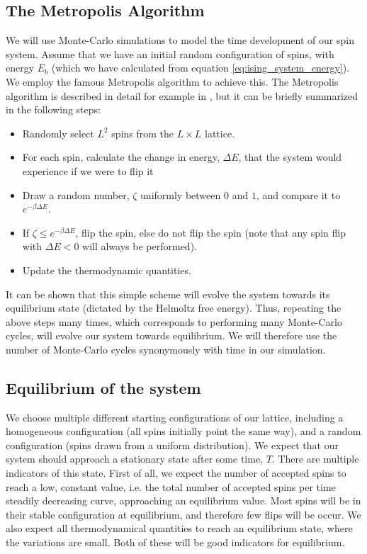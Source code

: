 \documentclass[a4paper, 10pt]{article}
\begin{document}
\subsection{The Metropolis Algorithm}\label{Monte-Carlo_algo}
We will use Monte-Carlo simulations to model the time development of our spin system. Assume that we have an initial random configuration of spins, with energy $E_b$ (which we have calculated from equation \ref{eq:ising_system_energy}). We employ the famous Metropolis algorithm to achieve this. The Metropolis algorithm is described in detail for example in \cite{Metropolis}, but it can be briefly summarized in the following steps:
\begin{itemize}
\item Randomly select $L^2$ spins from the $L\times L$ lattice.
\item For each spin, calculate the change in energy, $\Delta E$, that the system would experience if we were to flip it
\item Draw a random number, $\zeta$ uniformly between $0$ and $1$, and compare it to $e^{-\beta \Delta E}$. \item If $\zeta \leq e^{-\beta \Delta E}$, flip the spin, else do not flip the spin (note that any spin flip with $\Delta E < 0$ will always be performed).
\item Update the thermodynamic quantities.
\end{itemize}
It can be shown that this simple scheme will evolve the system towards its equilibrium state (dictated by the Helmoltz free energy). Thus, repeating the above steps many times, which corresponds to performing many Monte-Carlo cycles, will evolve our system towards equilibrium. We will therefore use the number of Monte-Carlo cycles synonymously with time in our simulation.
\subsection{Equilibrium of the system}\label{equilibrium_system}
We choose multiple different starting configurations of our lattice, including a homogeneous configuration (all spins initially point the same way), and a random configuration (spins drawn from a uniform distribution). We expect that our system should approach a stationary state after some time, $T$. There are multiple indicators of this state. First of all, we expect the number of accepted spins to reach a low, constant value, i.e. the total number of accepted spins  per time steadily decreasing curve, approaching an equilibrium value. Most spins will be in their stable configuration at equilibrium, and therefore few flips will be occur. We also expect all thermodynamical quantities to reach an equilibrium state, where the variations are small. Both of these will be good indicators for equilibrium. 
\newpage
\end{document}

